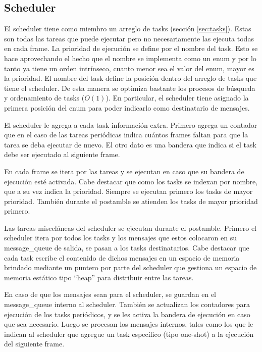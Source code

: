 \subsection{Scheduler}
\label{sec:scheduler}
El scheduler tiene como miembro un arreglo de tasks (sección \ref{sec:tasks}).
Estas son todas las tareas que puede ejecutar pero no necesariamente las ejecuta
todas en cada frame. La prioridad de ejecución se define por el nombre del task.
Esto se hace aprovechando el hecho que el nombre se implementa como un enum y
por lo tanto ya tiene un orden intrínseco, cuanto menor sea el valor del enum,
mayor es la prioridad. El nombre del task define la posición dentro del arreglo
de tasks que tiene el scheduler. De esta manera se optimiza bastante los
procesos de búsqueda y ordenamiento de tasks ($O(1)$). En particular, el
scheduler tiene asignado la primera posición del enum para poder indicarlo como
destinatario de mensajes.

El scheduler le agrega a cada task información extra. Primero agrega un contador
que en el caso de las tareas periódicas indica cuántos frames faltan para que la
tarea se deba ejecutar de nuevo. El otro dato es una bandera que indica si el
task debe ser ejecutado al siguiente frame.

En cada frame se itera por las tareas y se ejecutan en caso que su bandera de
ejecución esté activada. Cabe destacar que como los tasks se indexan por nombre,
que a su vez indica la prioridad. Siempre se ejecutan primero los tasks de mayor
prioridad. También durante el postamble se atienden los tasks de mayor prioridad
primero.

Las tareas misceláneas del scheduler se ejecutan durante el postamble. Primero
el scheduler itera por todos los tasks y los mensajes que estos colocaron en su
message\_queue de salida, se pasan a los tasks destinatarios. Cabe destacar que
cada task escribe el contenido de dichos mensajes en un espacio de memoria
brindado mediante un puntero por parte del scheduler que gestiona un espacio de
memoria estático tipo ``heap'' para distribuir entre las tareas.

En caso de que los mensajes sean para el scheduler, se guardan en el
message\_queue interno al scheduler. También se actualizan los contadores para
ejecución de los tasks periódicos, y se les activa la bandera de ejecución en
caso que sea necesario. Luego se procesan los mensajes internos, tales como los
que le indican al scheduler que agregue un task específico (tipo one-shot) a la
ejecución del siguiente frame.


